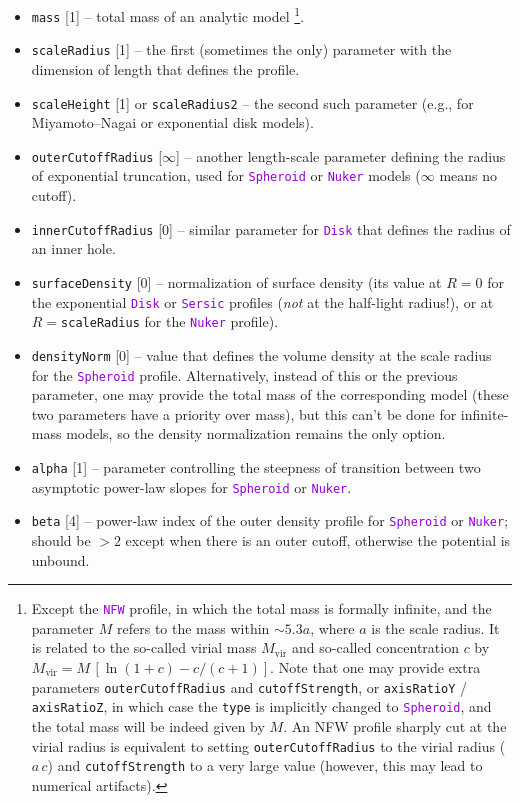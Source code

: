 \documentclass[12pt]{article}
\newcommand{\ttt}[1]{\textcolor{darkviolet}{\texttt{#1}}}
\newcommand{\ppp}[1]{\textcolor{darkolive} {\texttt{#1}}}
\begin{document}
\begin{itemize}
\item \ppp{mass} [1] -- total mass of an analytic model%
\footnote{Except the \ttt{NFW} profile, in which the total mass is formally infinite, and the parameter $M$ refers to the mass within $\sim 5.3a$, where $a$ is the scale radius. It is related to the so-called virial mass $M_\mathrm{vir}$ and so-called concentration $c$ by $M_\mathrm{vir}=M\,[\ln(1+c)-c/(c+1)]$. Note that one may provide extra parameters \ppp{outerCutoffRadius} and \ppp{cutoffStrength}, or \ppp{axisRatioY} / \ppp{axisRatioZ}, in which case the \ppp{type} is implicitly changed to \ttt{Spheroid}, and the total mass will be indeed given by $M$. An NFW profile sharply cut at the virial radius is equivalent to setting \ppp{outerCutoffRadius} to the virial radius ($a\,c$) and \ppp{cutoffStrength} to a very large value (however, this may lead to numerical artifacts).}.
\item \ppp{scaleRadius} [1] -- the first (sometimes the only) parameter with the dimension of length that defines the profile.
\item \ppp{scaleHeight} [1] or \ppp{scaleRadius2} -- the second such parameter (e.g., for Miyamoto--Nagai or exponential disk models).
\item \ppp{outerCutoffRadius} [$\infty$] -- another length-scale parameter defining the radius of exponential truncation, used for \ttt{Spheroid} or \ttt{Nuker} models ($\infty$ means no cutoff).
\item \ppp{innerCutoffRadius} [0] -- similar parameter for \ttt{Disk} that defines the radius of an inner hole.
\item \ppp{surfaceDensity} [0] -- normalization of surface density (its value at $R=0$ for the exponential \ttt{Disk} or \ttt{Sersic} profiles (\textit{not} at the half-light radius!), or at $R=$\ppp{scaleRadius} for the \ttt{Nuker} profile).
\item \ppp{densityNorm} [0] -- value that defines the volume density at the scale radius for the \ttt{Spheroid} profile. Alternatively, instead of this or the previous parameter, one may provide the total mass of the corresponding model (these two parameters have a priority over mass), but this can't be done for infinite-mass models, so the density normalization remains the only option.
\item \ppp{alpha} [1] -- parameter controlling the steepness of transition between two asymptotic power-law slopes for \ttt{Spheroid} or \ttt{Nuker}.
\item \ppp{beta} [4] -- power-law index of the outer density profile for \ttt{Spheroid} or \ttt{Nuker}; should be $>2$ except when there is an outer cutoff, otherwise the potential is unbound.

\end{itemize}
\end{document}
